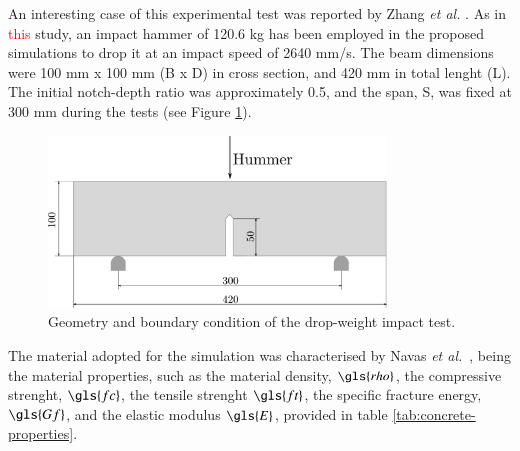 \documentclass[preprint,12pt,a4paper]{elsarticle}
\begin{document}
An interesting case of this experimental test was reported by Zhang {\it et al.} \cite{Zhang_2010a}. As in \textcolor{red}{this} study, an impact hammer of 120.6 kg has been employed in the proposed simulations to drop it at an impact
speed of 2640 mm/s. The beam dimensions were 100 mm x 100 mm (B x D)
in cross section, and 420 mm in total lenght (L). The initial
notch-depth ratio was approximately 0.5, and the span, S, was fixed at
300 mm during the tests (see Figure
\ref{fig:geometry-drop-weight-impact-test}).
\begin{figure}
  \centering
  \includegraphics[width=0.8\textwidth]{./Figure-impact-test}
  \caption{Geometry and boundary condition of the drop-weight impact test.}
  \label{fig:geometry-drop-weight-impact-test}
\end{figure}
The material adopted for the simulation was characterised by Navas
{\it et al.}~\cite{Navas_2017_ES}, being the material properties, such
as the material density, $\gls{rho}$, the compressive strenght, $\gls{fc}$,
the tensile strenght $\gls{ft}$, the specific fracture energy, $\gls{Gf}$,
and the elastic modulus $\gls{E}$, provided in table \ref{tab:concrete-properties}.\\
\end{document}
